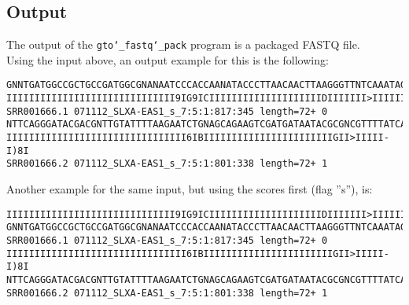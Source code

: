 \subsection*{Output}
The output of the \texttt{gto\char`_fastq\char`_pack} program is a packaged FASTQ file.\\
Using the input above, an output example for this is the following:
\begin{lstlisting}
GNNTGATGGCCGCTGCCGATGGCGNANAATCCCACCAANATACCCTTAACAACTTAAGGGTTNTCAAATAGA
IIIIIIIIIIIIIIIIIIIIIIIIIIIIII9IG9ICIIIIIIIIIIIIIIIIIIIIDIIIIIII>IIIIII/
SRR001666.1 071112_SLXA-EAS1_s_7:5:1:817:345 length=72+	0
NTTCAGGGATACGACGNTTGTATTTTAAGAATCTGNAGCAGAAGTCGATGATAATACGCGNCGTTTTATCAN
IIIIIIIIIIIIIIIIIIIIIIIIIIIIIIII6IBIIIIIIIIIIIIIIIIIIIIIIIGII>IIIII-I)8I
SRR001666.2 071112_SLXA-EAS1_s_7:5:1:801:338 length=72+	1
\end{lstlisting}
Another example for the same input, but using the scores first (flag ''s''), is:
\begin{lstlisting}
IIIIIIIIIIIIIIIIIIIIIIIIIIIIII9IG9ICIIIIIIIIIIIIIIIIIIIIDIIIIIII>IIIIII/
GNNTGATGGCCGCTGCCGATGGCGNANAATCCCACCAANATACCCTTAACAACTTAAGGGTTNTCAAATAGA
SRR001666.1 071112_SLXA-EAS1_s_7:5:1:817:345 length=72+	0
IIIIIIIIIIIIIIIIIIIIIIIIIIIIIIII6IBIIIIIIIIIIIIIIIIIIIIIIIGII>IIIII-I)8I
NTTCAGGGATACGACGNTTGTATTTTAAGAATCTGNAGCAGAAGTCGATGATAATACGCGNCGTTTTATCAN
SRR001666.2 071112_SLXA-EAS1_s_7:5:1:801:338 length=72+	1
\end{lstlisting}
